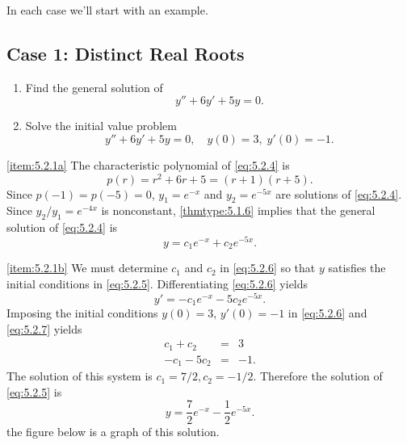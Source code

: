 \documentclass{ximera}
\begin{document}
In each case we'll start with an example.
 
\subsection*{Case 1: Distinct Real Roots}
 
\begin{example}\label{example:5.2.1}
\begin{enumerate}
    \item \label{item:5.2.1a}%
Find the general solution of
\begin{equation} \label{eq:5.2.4}
y''+6y'+5y=0.
\end{equation}
 
\item \label{item:5.2.1b}%
Solve the initial value problem
\begin{equation} \label{eq:5.2.5}
y''+6y'+5y=0, \quad   y(0)=3,\;  y'(0)=-1.
\end{equation}
\end{enumerate}
 
\begin{explanation}
\ref{item:5.2.1a}   The characteristic
polynomial of
 \eqref{eq:5.2.4} is
$$
p(r)=r^2+6r+5=(r+1)(r+5).
$$
Since $p(-1)=p(-5)=0$,  $y_1=e^{-x}$ and $y_2=e^{-5x}$
are solutions of \eqref{eq:5.2.4}. Since $y_2/y_1=e^{-4x}$  is
nonconstant, \ref{thmtype:5.1.6} implies that the general solution
of \eqref{eq:5.2.4} is
\begin{equation} \label{eq:5.2.6}
y=c_1e^{-x}+c_2e^{-5x}.
\end{equation}
 
\ref{item:5.2.1b} We  must determine $c_1$ and $c_2$
in  \eqref{eq:5.2.6} so that $y$ satisfies the initial conditions in
 \eqref{eq:5.2.5}. Differentiating  \eqref{eq:5.2.6} yields
\begin{equation} \label{eq:5.2.7}
y'=-c_1e^{-x}-5c_2e^{-5x}.
\end{equation}
Imposing the initial conditions $y(0)=3,\, y'(0)=-1$ in \eqref{eq:5.2.6}
and \eqref{eq:5.2.7} yields
$$\begin{array}{rcr}
c_1+c_2 & = & 3\\
-c_1-5c_2 & = & -1.
\end{array}$$
 The solution of this system is $c_1=7/2,c_2=-1/2$.  Therefore
the solution of  \eqref{eq:5.2.5} is
$$
y=\frac{7}{2}e^{-x}-\frac{1}{2}e^{-5x}.
$$
 the figure below is a graph
of this solution.

\begin{center}
\end{center}
\end{explanation}
\end{example}
\end{document}
